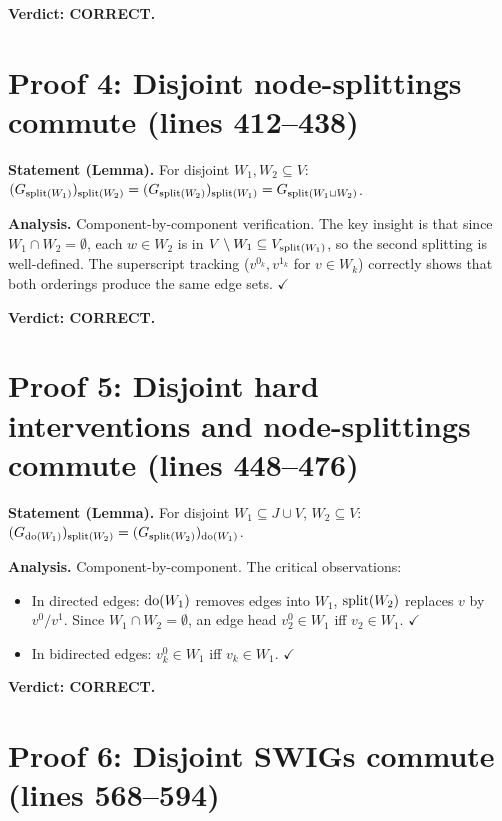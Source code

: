 \documentclass{article}
\begin{document}
\textbf{Verdict: CORRECT.}

\section{Proof 4: Disjoint node-splittings commute (lines 412--438)}

\textbf{Statement (Lemma).}
For disjoint $W_1,W_2\subseteq V$:
$(G_{\mathrm{split}(W_1)})_{\mathrm{split}(W_2)} = (G_{\mathrm{split}(W_2)})_{\mathrm{split}(W_1)} = G_{\mathrm{split}(W_1\sqcup W_2)}$.

\textbf{Analysis.}
Component-by-component verification.  The key insight is that since $W_1\cap W_2=\emptyset$,
each $w\in W_2$ is in $V\setminus W_1\subseteq V_{\mathrm{split}(W_1)}$, so the second
splitting is well-defined.  The superscript tracking ($v^{0_k},v^{1_k}$
for $v\in W_k$) correctly shows that both orderings produce the same edge sets.
$\checkmark$

\textbf{Verdict: CORRECT.}

\section{Proof 5: Disjoint hard interventions and node-splittings commute (lines 448--476)}

\textbf{Statement (Lemma).}
For disjoint $W_1\subseteq J\cup V$, $W_2\subseteq V$:
$(G_{\operatorname{do}(W_1)})_{\mathrm{split}(W_2)} = (G_{\mathrm{split}(W_2)})_{\operatorname{do}(W_1)}$.

\textbf{Analysis.}
Component-by-component.  The critical observations:
\begin{itemize}
  \item In directed edges: $\operatorname{do}(W_1)$ removes edges into $W_1$, $\mathrm{split}(W_2)$
    replaces $v$ by $v^0/v^1$.  Since $W_1\cap W_2=\emptyset$, an edge head
    $v_2^0\in W_1$ iff $v_2\in W_1$.  $\checkmark$
  \item In bidirected edges: $v_k^0\in W_1$ iff $v_k\in W_1$.  $\checkmark$
\end{itemize}

\textbf{Verdict: CORRECT.}

\section{Proof 6: Disjoint SWIGs commute (lines 568--594)}
\end{document}
